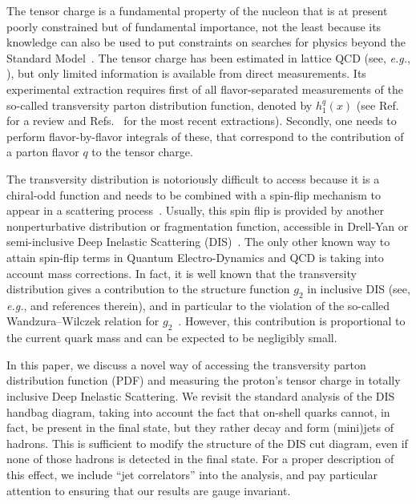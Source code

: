 \documentclass[preprintnumbers,floatfix,nofootinbib]{revtex4}
\newcommand{\eg}{{\em e.g.}}
\begin{document}
The tensor charge is a fundamental property of the nucleon that is at
present poorly constrained but of fundamental importance, not the least because its knowledge can also be used to put constraints on searches for physics beyond the Standard Model~\cite{Cirigliano:2013xha,Bhattacharya:2015esa,Courtoy:2015haa,Tomalak:2017owk,Yamanaka:2017mef}.
The tensor charge has been estimated in lattice QCD (see, \eg,
\cite{Green:2012ej,Bali:2014nma,Bhattacharya:2015wna,Abdel-Rehim:2015owa,Bhattacharya:2016zcn}), but
only limited information is available from direct measurements. Its experimental extraction requires first of all flavor-separated measurements of the so-called transversity parton distribution function,
denoted by $h_1^q(x)$ (see Ref.~\cite{Barone:2001sp} for a review and
Refs.~\cite{Radici:2015mwa,Anselmino:2015sxa,Kang:2015msa} for the most recent
extractions). Secondly, one needs to perform flavor-by-flavor integrals of these, that correspond to the contribution of a parton flavor $q$ to the tensor charge. 

The transversity distribution is notoriously difficult to access because it is
a chiral-odd function and needs to be combined with a spin-flip mechanism to
appear in a scattering process~\cite{Jaffe:1996zw}. Usually, this spin flip is provided by another
nonperturbative distribution or fragmentation function, accessible in Drell-Yan or semi-inclusive Deep Inelastic Scattering (DIS)~\cite{Ralston:1979ys,Jaffe:1991kp,Jaffe:1993xb,Collins:1992kk}.
The only other known way to attain spin-flip terms in Quantum Electro-Dynamics and QCD is taking into account mass corrections. In fact, it is well known that the transversity distribution gives a contribution to the structure function $g_2$ in inclusive DIS (see, \eg, \cite{Accardi:2009au} and references therein), and in particular to the violation of the so-called Wandzura--Wilczek relation for $g_2$~\cite{Wandzura:1977qf}. However, this contribution is proportional to the current quark mass and can be expected to be negligibly small.


In this paper, we discuss a novel way of accessing the transversity parton distribution function (PDF) and measuring the proton's tensor charge in totally inclusive Deep Inelastic Scattering. 
We revisit the standard analysis of the DIS handbag diagram, taking into account the fact that on-shell quarks cannot, in fact, be present in the final state, but they rather decay and form (mini)jets of hadrons. This is sufficient to modify the structure of the DIS cut diagram, even if none of those hadrons is detected in the final state. For a proper description of this effect, we include ``jet correlators'' into the analysis, and pay particular attention to ensuring that our results are gauge invariant.
\end{document}
